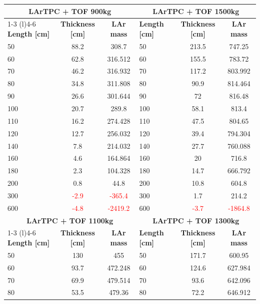 \begin{table}
\centering
\small
\setlength{\tabcolsep}{3pt} %
\begin{tabularx}{\textwidth}{@{} Xcc | Xcc @{}}
\toprule
\multicolumn{3}{c|}{\textbf{\ac{LArTPC} + TOF 900kg}} & \multicolumn{3}{c}{\textbf{\ac{LArTPC} + TOF 1500kg}} \\
\cmidrule(r){1-3} \cmidrule(l){4-6}
\textbf{Length [cm]} & \textbf{Thickness [cm]} & \textbf{LAr mass} & \textbf{Length [cm]} & \textbf{Thickness [cm]} & \textbf{LAr mass} \\
\midrule
50 & 88.2 & 308.7 & 50 & 213.5 & 747.25 \\
60 & 62.8 & 316.512 & 60 & 155.5 & 783.72 \\
70 & 46.2 & 316.932 & 70 & 117.2 & 803.992 \\
80 & 34.8 & 311.808 & 80 & 90.9 & 814.464 \\
90 & 26.6 & 301.644 & 90 & 72 & 816.48 \\
100 & 20.7 & 289.8 & 100 & 58.1 & 813.4 \\
110 & 16.2 & 274.428 & 110 & 47.5 & 804.65 \\
120 & 12.7 & 256.032 & 120 & 39.4 & 794.304 \\
140 & 7.8 & 214.032 & 140 & 27.7 & 760.088 \\
160 & 4.6 & 164.864 & 160 & 20 & 716.8 \\
180 & 2.3 & 104.328 & 180 & 14.7 & 666.792 \\
200 & 0.8 & 44.8 & 200 & 10.8 & 604.8 \\
300 & \textcolor{red}{-2.9} & \textcolor{red}{-365.4} & 300 & 1.7 & 214.2 \\
600 & \textcolor{red}{-4.8} & \textcolor{red}{-2419.2} & 600 & \textcolor{red}{-3.7} & \textcolor{red}{-1864.8} \\
\midrule
\multicolumn{3}{c|}{\textbf{\ac{LArTPC} + TOF 1100kg}} & \multicolumn{3}{c}{\textbf{\ac{LArTPC} + TOF 1300kg}} \\
\cmidrule(r){1-3} \cmidrule(l){4-6}
\textbf{Length [cm]} & \textbf{Thickness [cm]} & \textbf{LAr mass} & \textbf{Length [cm]} & \textbf{Thickness [cm]} & \textbf{LAr mass} \\
\midrule
50 & 130 & 455 & 50 & 171.7 & 600.95 \\
60 & 93.7 & 472.248 & 60 & 124.6 & 627.984 \\
70 & 69.9 & 479.514 & 70 & 93.6 & 642.096 \\
80 & 53.5 & 479.36 & 80 & 72.2 & 646.912 \\

\end{tabularx}
\end{table}
